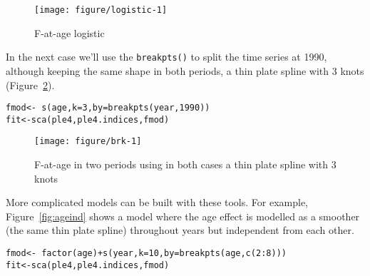 \documentclass[a4paper,english,10pt]{article}\usepackage[]{graphicx}\usepackage[]{color}
\makeatletter
\def\maxwidth{ %
  \ifdim\Gin@nat@width>\linewidth
    \linewidth
  \else
    \Gin@nat@width
  \fi
}
\newcommand{\hlnum}[1]{\textcolor[rgb]{0.2,0.2,0.2}{#1}}%
\newcommand{\hlopt}[1]{\textcolor[rgb]{0.2,0.2,0.2}{#1}}%
\newcommand{\hlstd}[1]{\textcolor[rgb]{0,0,0}{#1}}%
\newcommand{\hlkwb}[1]{\textcolor[rgb]{0.361,0.506,0.596}{#1}}%
\newcommand{\hlkwc}[1]{\textcolor[rgb]{0.361,0.506,0.596}{#1}}%
\newcommand{\hlkwd}[1]{\textcolor[rgb]{0.361,0.506,0.596}{#1}}%
\newenvironment{kframe}{%
 \def\at@end@of@kframe{}%
 \ifinner\ifhmode%
  \def\at@end@of@kframe{\end{minipage}}%
  \begin{minipage}{\columnwidth}%
 \fi\fi%
 \def\FrameCommand##1{\hskip\@totalleftmargin \hskip-\fboxsep
 \colorbox{shadecolor}{##1}\hskip-\fboxsep
     \hskip-\linewidth \hskip-\@totalleftmargin \hskip\columnwidth}%
 \MakeFramed {\advance\hsize-\width
   \@totalleftmargin\z@ \linewidth\hsize
   \@setminipage}}%
 {\par\unskip\endMakeFramed%
 \at@end@of@kframe}
\newenvironment{knitrout}{}{} %
\newcommand{\code}[1]{{\texttt{#1}}}
\makeatother
\begin{document}
\begin{knitrout}
\color{fgcolor}\begin{figure}[H]

{\centering \texttt{[image: figure/logistic-1]} 

}

\caption[F-at-age logistic]{F-at-age logistic}\label{fig:logistic}
\end{figure}


\end{knitrout}

In the next case we'll use the \code{breakpts()} to split the time series at 1990, although keeping the same shape in both periods, a thin plate spline with 3 knots (Figure~\ref{fig:brk}).

\begin{knitrout}
\color{fgcolor}\begin{kframe}
\begin{alltt}
\hlstd{fmod} \hlkwb{<-} \hlopt{~}\hlkwd{s}\hlstd{(age,} \hlkwc{k} \hlstd{=} \hlnum{3}\hlstd{,} \hlkwc{by} \hlstd{=} \hlkwd{breakpts}\hlstd{(year,} \hlnum{1990}\hlstd{))}
\hlstd{fit} \hlkwb{<-} \hlkwd{sca}\hlstd{(ple4, ple4.indices, fmod)}
\end{alltt}
\end{kframe}
\end{knitrout}

\begin{knitrout}
\color{fgcolor}\begin{figure}[H]

{\centering \texttt{[image: figure/brk-1]} 

}

\caption[F-at-age in two periods using in both cases a thin plate spline with 3 knots]{F-at-age in two periods using in both cases a thin plate spline with 3 knots}\label{fig:brk}
\end{figure}


\end{knitrout}

More complicated models can be built with these tools. For example, Figure~\ref{fig:ageind} shows a model where the age effect is modelled as a smoother (the same thin plate spline) throughout years but independent from each other.

\begin{knitrout}
\color{fgcolor}\begin{kframe}
\begin{alltt}
\hlstd{fmod} \hlkwb{<-} \hlopt{~} \hlkwd{factor}\hlstd{(age)} \hlopt{+} \hlkwd{s}\hlstd{(year,} \hlkwc{k}\hlstd{=}\hlnum{10}\hlstd{,} \hlkwc{by} \hlstd{=} \hlkwd{breakpts}\hlstd{(age,} \hlkwd{c}\hlstd{(}\hlnum{2}\hlopt{:}\hlnum{8}\hlstd{)))}
\hlstd{fit} \hlkwb{<-} \hlkwd{sca}\hlstd{(ple4, ple4.indices, fmod)}
\end{alltt}
\end{kframe}
\end{knitrout}
\end{document}

